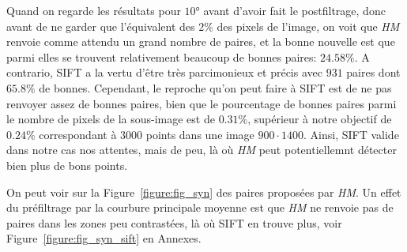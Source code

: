 \documentclass[
	a4paper, %
	10pt, %
	unnumberedsections, %
	twoside, %
]{LTJournalArticle}
\begin{document}
Quand on regarde les résultats pour $10$° avant d'avoir fait le postfiltrage, donc avant de ne garder que l'équivalent des $2\%$ des pixels de l'image,
on voit que \textit{HM} renvoie comme attendu un grand nombre de paires, et la bonne nouvelle est que parmi elles se trouvent relativement beaucoup
de bonnes paires: $24.58\%$. A contrario, SIFT a la vertu d'être très parcimonieux et précis avec $931$ paires dont $65.8\%$ de bonnes.
Cependant, le reproche qu'on peut faire à SIFT est de ne pas renvoyer assez de bonnes paires, bien que le pourcentage de bonnes paires
parmi le nombre de pixels de la sous-image est de $0.31\%$, supérieur à notre objectif de $0.24\%$ correspondant à 3000 points dans une
image $900 \cdot 1400$. Ainsi, SIFT valide dans notre cas nos attentes, mais de peu, là où \textit{HM} peut potentiellemnt détecter bien
plus de bons points.

On peut voir sur la Figure~\ref{figure:fig_syn} des paires proposées par \textit{HM}.
Un effet du préfiltrage par la courbure principale moyenne est que \textit{HM} ne renvoie pas
de paires dans les zones peu contrastées, là où SIFT en trouve plus, voir Figure~\ref{figure:fig_syn_sift}
en Annexes.
\end{document}
